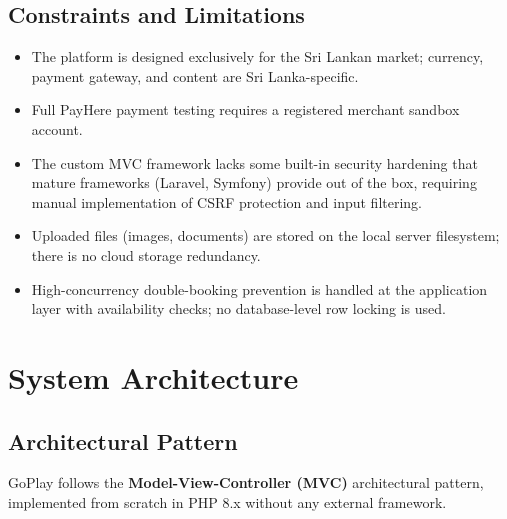 \documentclass[12pt,a4paper]{report}
\begin{document}
\section{Constraints and Limitations}

\begin{itemize}[leftmargin=1.5cm]
  \item The platform is designed exclusively for the Sri Lankan market; currency, payment gateway, and content are Sri Lanka-specific.
  \item Full PayHere payment testing requires a registered merchant sandbox account.
  \item The custom MVC framework lacks some built-in security hardening that mature frameworks (Laravel, Symfony) provide out of the box, requiring manual implementation of CSRF protection and input filtering.
  \item Uploaded files (images, documents) are stored on the local server filesystem; there is no cloud storage redundancy.
  \item High-concurrency double-booking prevention is handled at the application layer with availability checks; no database-level row locking is used.
\end{itemize}

\chapter{System Architecture}

\section{Architectural Pattern}

GoPlay follows the \textbf{Model-View-Controller (MVC)} architectural pattern, implemented from scratch in PHP 8.x without any external framework.
\end{document}
